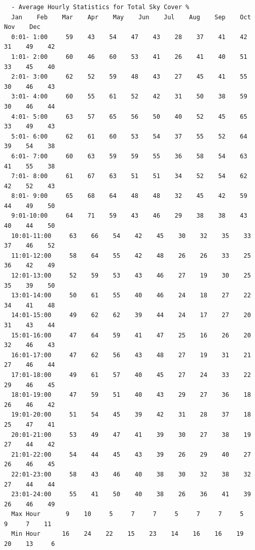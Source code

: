 \begin{lstlisting}
  - Average Hourly Statistics for Total Sky Cover %
  Jan    Feb    Mar    Apr    May    Jun    Jul    Aug    Sep    Oct    Nov    Dec   
  0:01- 1:00     59    43    54    47    43    28    37    41    42    31    49    42 
  1:01- 2:00     60    46    60    53    41    26    41    40    51    33    45    40 
  2:01- 3:00     62    52    59    48    43    27    45    41    55    30    46    43 
  3:01- 4:00     60    55    61    52    42    31    50    38    59    30    46    44 
  4:01- 5:00     63    57    65    56    50    40    52    45    65    33    49    43 
  5:01- 6:00     62    61    60    53    54    37    55    52    64    39    54    38 
  6:01- 7:00     60    63    59    59    55    36    58    54    63    41    55    38 
  7:01- 8:00     61    67    63    51    51    34    52    54    62    42    52    43 
  8:01- 9:00     65    68    64    48    48    32    45    42    59    44    49    50 
  9:01-10:00     64    71    59    43    46    29    38    38    43    40    44    50 
  10:01-11:00     63    66    54    42    45    30    32    35    33    37    46    52 
  11:01-12:00     58    64    55    42    48    26    26    33    25    36    42    49 
  12:01-13:00     52    59    53    43    46    27    19    30    25    35    39    50 
  13:01-14:00     50    61    55    40    46    24    18    27    22    34    41    48 
  14:01-15:00     49    62    62    39    44    24    17    27    20    31    43    44 
  15:01-16:00     47    64    59    41    47    25    16    26    20    32    46    43 
  16:01-17:00     47    62    56    43    48    27    19    31    21    27    46    44 
  17:01-18:00     49    61    57    40    45    27    24    33    22    29    46    45 
  18:01-19:00     47    59    51    40    43    29    27    36    18    26    46    42 
  19:01-20:00     51    54    45    39    42    31    28    37    18    25    47    41 
  20:01-21:00     53    49    47    41    39    30    27    38    19    27    44    42 
  21:01-22:00     54    44    45    43    39    26    29    40    27    26    46    45 
  22:01-23:00     58    43    46    40    38    30    32    38    32    27    44    44 
  23:01-24:00     55    41    50    40    38    26    36    41    39    26    46    49 
  Max Hour       9    10     5     7     7     5     7     7     5     9     7    11  
  Min Hour      16    24    22    15    23    14    16    16    19    20    13     6  


\end{lstlisting}
